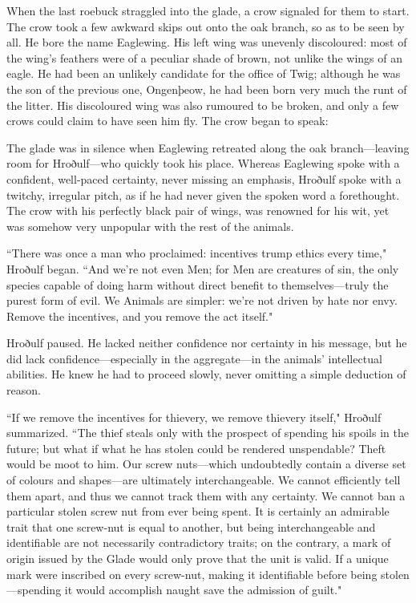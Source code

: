 When the last roebuck straggled into the glade, a crow signaled for them to start.
The crow took a few awkward skips out onto the oak branch, so as to be seen by all.
He bore the name Eaglewing.
His left wing was unevenly discoloured: most of the wing's feathers were of a peculiar shade of brown, not unlike the wings of an eagle.
He had been an unlikely candidate for the office of Twig; although he was the son of the previous one, Ongenþeow, he had been born very much the runt of the litter.
His discoloured wing was also rumoured to be broken, and only a few crows could claim to have seen him fly.
The crow began to speak:



The glade was in silence when Eaglewing retreated along the oak branch---leaving room for Hroðulf---who quickly took his place.
Whereas Eaglewing spoke with a confident, well-paced certainty, never missing an emphasis, Hroðulf spoke with a twitchy, irregular pitch, as if he had never given the spoken word a forethought.
The crow with his perfectly black pair of wings, was renowned for his wit, yet was somehow very unpopular with the rest of the animals.

``There was once a man who proclaimed: incentives trump ethics every time," Hroðulf began.
``And we're not even Men; for Men are creatures of sin, the only species capable of doing harm without direct benefit to themselves---truly the purest form of evil.
We Animals are simpler: we're not driven by hate nor envy.
Remove the incentives, and you remove the act itself."

Hroðulf paused.
He lacked neither confidence nor certainty in his message, but he did lack confidence---especially in the aggregate---in the animals' intellectual abilities.
He knew he had to proceed slowly, never omitting a simple deduction of reason.

``If we remove the incentives for thievery, we remove thievery itself," Hroðulf summarized.
``The thief steals only with the prospect of spending his spoils in the future; but what if what he has stolen could be rendered unspendable?
Theft would be moot to him.
Our screw nuts---which undoubtedly contain a diverse set of colours and shapes---are ultimately interchangeable.
We cannot efficiently tell them apart, and thus we cannot track them with any certainty.
We cannot ban a particular stolen screw nut from ever being spent.
It is certainly an admirable trait that one screw-nut is equal to another, but being interchangeable and identifiable are not necessarily contradictory traits; on the contrary, a mark of origin issued by the Glade would only prove that the unit is valid.
If a unique mark were inscribed on every screw-nut, making it identifiable before being stolen---spending it would accomplish naught save the admission of guilt."

